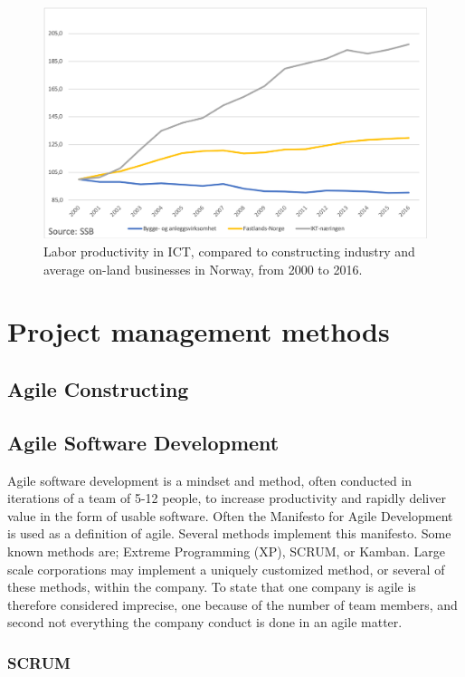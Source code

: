 \begin{figure}
    \centering
    \includegraphics[width=\textwidth]{fig/ba_on-land_ICT.png}
    \caption{Labor productivity in ICT, compared to constructing industry and average on-land businesses in Norway, from 2000 to 2016.}
    \label{fig:LP_ICT_VS}
\end{figure}

\section{Project management methods}
\subsection{Agile Constructing}
\subsection{Agile Software Development}
Agile software development is a mindset and method, often conducted in iterations of a team of 5-12 people, to increase productivity and rapidly deliver value in the form of usable software. Often the Manifesto for Agile Development is used as a definition of agile. Several methods implement this manifesto. Some known methods are; Extreme Programming (XP), SCRUM, or Kamban. Large scale corporations may implement a uniquely customized method, or several of these methods, within the company. To state that one company is agile is therefore considered imprecise, one because of the number of team members, and second not everything the company conduct is done in an agile matter.
\subsubsection{SCRUM}
